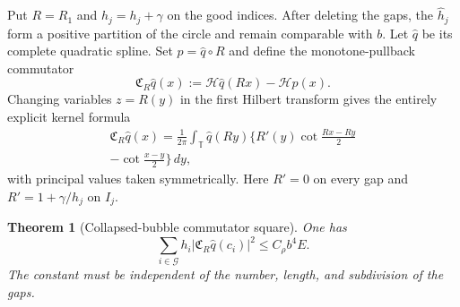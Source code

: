 \documentclass[11pt]{amsart}
\numberwithin{equation}{section}
\newtheorem{theorem}{Theorem}[section]
\theoremstyle{definition}
\theoremstyle{remark}
\newcommand{\T}{\mathbb T}
\newcommand{\Hil}{\mathcal H}
\begin{document}
Put $R=R_1$ and $\widehat h_j=h_j+\gamma$ on the good indices.  After
deleting the gaps, the $\widehat h_j$ form a positive partition of the
circle and remain comparable with $b$.  Let $\widehat q$ be its complete
quadratic spline.  Set $p=\widehat q\circ R$ and define the monotone-pullback
commutator
\begin{equation}\label{ZG:eq:collapse-commutator}
 \mathfrak C_R\widehat q(x)
 :=\Hil\widehat q(Rx)-\Hil p(x).
\end{equation}
Changing variables $z=R(y)$ in the first Hilbert transform gives the
entirely explicit kernel formula
\begin{multline}\label{ZG:eq:collapse-commutator-kernel}
 \mathfrak C_R\widehat q(x)=\frac1{2\pi}\int_\T
 \widehat q(Ry)\Big\{R'(y)
 \cot\frac{Rx-Ry}{2}\\
 -\cot\frac{x-y}{2}\Big\}\,dy ,
\end{multline}
with principal values taken symmetrically.  Here $R'=0$ on every gap and
$R'=1+\gamma/h_j$ on $I_j$.

\begin{theorem}[Collapsed-bubble commutator square]
\label{ZG:thm:collapse-commutator}
One has
\begin{equation}\label{ZG:eq:collapse-commutator-square}
 \boxed{
 \sum_{i\in\mathcal G}h_i
 |\mathfrak C_R\widehat q(c_i)|^2
 \le C_\rho b^4E.}
\end{equation}
The constant must be independent of the number, length, and subdivision
of the gaps.
\end{theorem}
\end{document}

